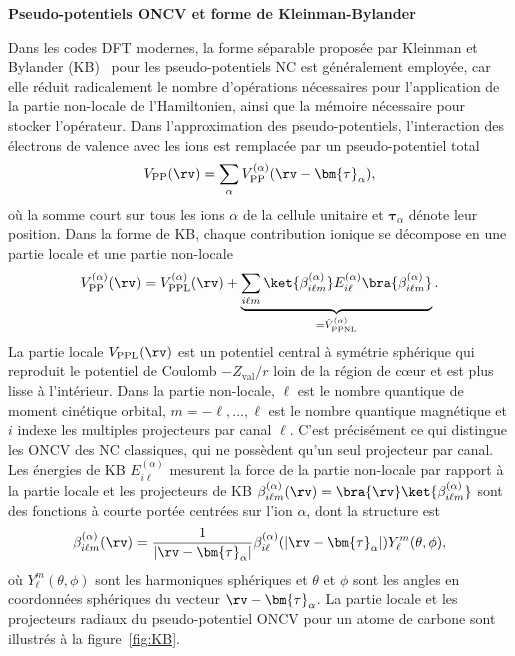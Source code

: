 \noindent\textbf{Pseudo-potentiels ONCV et forme de Kleinman-Bylander}

Dans les codes DFT modernes, la forme séparable proposée par Kleinman et Bylander (KB)~\cite{kleinmanEfficaciousFormModel1982} pour les pseudo-potentiels NC est généralement employée, car elle réduit radicalement le nombre d'opérations nécessaires pour l'application de la partie non-locale de l'Hamiltonien, ainsi que la mémoire nécessaire pour stocker l'opérateur. Dans l'approximation des pseudo-potentiels, l'interaction des électrons de valence avec les ions est remplacée par un pseudo-potentiel total
\begin{equation}
    V_\text{PP}(\rv)=\sum_\alpha V_\text{PP}^{(\alpha)}(\rv-\bm{\tau}_\alpha),
    \label{eqn:c2_pp_approx}
\end{equation}
où la somme court sur tous les ions $\alpha$ de la cellule unitaire et $\bm{\tau}_\alpha$ dénote leur position. Dans la forme de KB, chaque contribution ionique se décompose en une partie locale et une partie non-locale
\begin{equation}
    V^{(\alpha)}_\text{PP}(\rv) = V^{(\alpha)}_\text{PPL}(\rv)+\underbrace{\sum_{i\ell m}\ket{\beta_{i\ell m}^{(\alpha)}}E_{i\ell}^{(\alpha)}\bra{\beta_{i\ell m}^{(\alpha)}}}_{=\hat{V}_\text{PPNL}^{(\alpha)}}.
    \label{eqn:c1_VKB}
\end{equation}
La partie locale $V_\text{PPL}(\rv)$ est un potentiel central à symétrie sphérique qui reproduit le potentiel de Coulomb $-Z_\text{val}/r$ loin de la région de c\oe ur et est plus lisse à l'intérieur. Dans la partie non-locale, $\ell$ est le nombre quantique de moment cinétique orbital, $m=-\ell,\dots,\ell$ est le nombre quantique magnétique et $i$ indexe les multiples projecteurs par canal $\ell$. C'est précisément ce qui distingue les ONCV des NC classiques, qui ne possèdent qu'un seul projecteur par canal. Les énergies de KB $E_{i\ell}^{(\alpha)}$ mesurent la force de la partie non-locale par rapport à la partie locale et les projecteurs de KB $\beta_{i\ell m}^{(\alpha)}(\rv)=\bra{\rv}\ket{\beta_{i\ell m}^{(\alpha)}}$ sont des fonctions à courte portée centrées sur l'ion $\alpha$, dont la structure est
\begin{equation}
    \beta_{i\ell m}^{(\alpha)}(\rv)=\frac{1}{|\rv-\bm{\tau}_\alpha|}\beta_{i\ell}^{(\alpha)}(|\rv-\bm{\tau}_\alpha|)Y_{\ell}^m(\theta,\phi),
    \label{eqn:c2_betar}
\end{equation}
où $Y_\ell^m(\theta, \phi)$ sont les harmoniques sphériques et $\theta$ et $\phi$ sont les angles en coordonnées sphériques du vecteur $\rv-\bm{\tau}_\alpha$. La partie locale et les projecteurs radiaux du pseudo-potentiel ONCV pour un atome de carbone sont illustrés à la figure~\ref{fig:KB}.

